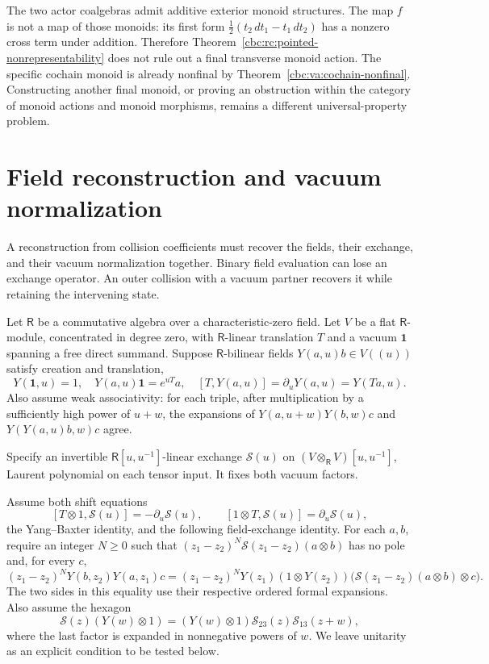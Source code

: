 The two actor coalgebras admit additive exterior
monoid structures. The map $f$ is not a map
of those monoids: its first form
$\tfrac12(t_2\,dt_1-t_1\,dt_2)$ has a nonzero
cross term under addition. Therefore
Theorem~\ref{cbc:rc:pointed-nonrepresentability}
does not rule out a final transverse monoid
action. The specific cochain monoid is
already nonfinal by
Theorem~\ref{cbc:va:cochain-nonfinal}.
Constructing another final monoid, or proving
an obstruction within the category of monoid
actions and monoid morphisms, remains a
different universal-property problem.

\section{Field reconstruction and vacuum normalization}
\label{cbc:rc:field-reconstruction}

A reconstruction from collision coefficients must
recover the fields, their exchange, and their vacuum
normalization together. Binary field evaluation can
lose an exchange operator. An outer collision with
a vacuum partner recovers it while retaining the
intervening state.

Let $\mathsf R$ be a commutative algebra over a
characteristic-zero field. Let $V$ be a flat
$\mathsf R$-module, concentrated in degree zero,
with $\mathsf R$-linear translation $T$ and a vacuum $\mathbf1$
spanning a free direct summand. Suppose $\mathsf R$-bilinear fields
$Y(a,u)b\in V((u))$ satisfy creation and translation,
\[
 Y(\mathbf1,u)=1,\quad Y(a,u)\mathbf1=e^{uT}a,
 \quad [T,Y(a,u)]=\partial_uY(a,u)=Y(Ta,u).
\]
Also assume weak associativity: for each triple, after
multiplication by a sufficiently high power of
$u+w$, the expansions of
$Y(a,u+w)Y(b,w)c$ and $Y(Y(a,u)b,w)c$ agree.

Specify an invertible $\mathsf R[u,u^{-1}]$-linear exchange $\mathcal S(u)$
on $(V\otimes_{\mathsf R}V)[u,u^{-1}]$,
Laurent polynomial on each tensor input. It fixes
both vacuum factors.

Assume both shift equations
\[
 [T\otimes1,\mathcal S(u)]=-\partial_u\mathcal S(u),
 \qquad [1\otimes T,\mathcal S(u)]=\partial_u\mathcal S(u),
\]
the Yang--Baxter identity, and the following field-exchange
identity. For each $a,b$, require an integer $N\geq0$
such that $(z_1-z_2)^N\mathcal S(z_1-z_2)(a\otimes b)$
has no pole and, for every $c$,
\[
 (z_1-z_2)^N Y(b,z_2)Y(a,z_1)c
 =(z_1-z_2)^N Y(z_1)(1\otimes Y(z_2))
       \bigl(\mathcal S(z_1-z_2)(a\otimes b)\otimes c\bigr).
\]
The two sides in this equality use their respective
ordered formal expansions. Also assume the hexagon
\begin{equation}\label{cbc:rc:field-hexagon}
 \mathcal S(z)(Y(w)\otimes1)
  =(Y(w)\otimes1)\mathcal S_{23}(z)\mathcal S_{13}(z+w),
\end{equation}
where the last factor is expanded in nonnegative
powers of $w$. We leave unitarity as an explicit
condition to be tested below.

